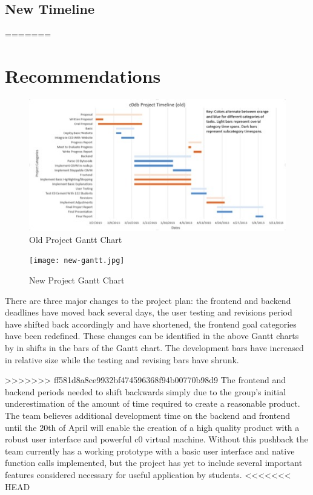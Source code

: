 \documentclass[11pt]{article}
\begin{document}
\subsection{New Timeline}
=======
\section{Recommendations}
\begin{figure}[h]
  \centering
  \includegraphics[width=\linewidth]{old-gantt.jpg}
  \caption{Old Project Gantt Chart}
  \label{fig:old-gantt}
\end{figure}
\begin{figure}[h]
  \centering
  \texttt{[image: new-gantt.jpg]}
  \caption{New Project Gantt Chart}
  \label{fig:new-gantt}
\end{figure}
There are three major changes to the project plan: the frontend and backend
deadlines have moved back several days, the user testing and revisions period
have shifted back accordingly and have shortened, the frontend goal categories
have been redefined. These changes can be identified in the above Gantt charts
by in shifts in the bars of the Gantt chart. The development bars have
increased in relative size while the testing and revising bars have shrunk.
\par
>>>>>>> ff581d8a8ce9932bf474596368f94b00770b98d9
The frontend and backend periods needed to shift backwards simply due to the
group’s initial underestimation of the amount of time required to create a
reasonable product. The team believes additional development time on the
backend and frontend until the 20th of April will enable the creation of a high
quality product with a robust user interface and powerful c0 virtual machine.
Without this pushback the team currently has a working prototype with a basic
user interface and native function calls implemented, but the project has yet
to include several important features considered necessary for useful
application by students.
<<<<<<< HEAD
\end{document}
